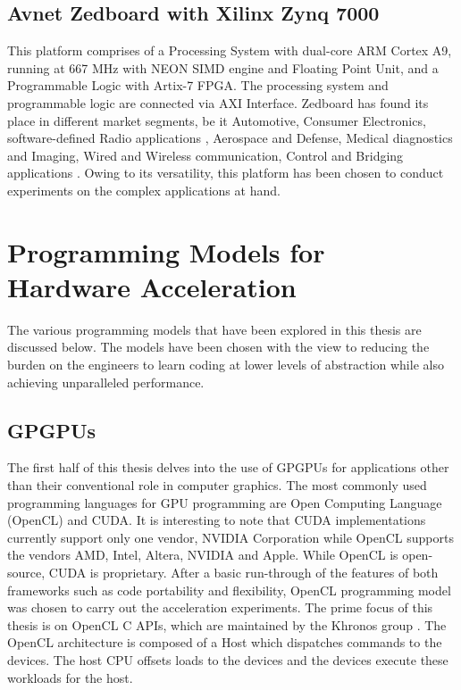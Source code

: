 \subsection{Avnet Zedboard with Xilinx Zynq 7000}
This platform comprises of a Processing System with dual-core ARM Cortex A9, running at 667 MHz with NEON SIMD engine and Floating Point Unit, and a Programmable Logic with Artix-7 FPGA. The processing system and programmable logic are connected via AXI Interface. Zedboard has found its place in different market segments, be it Automotive, Consumer Electronics, software-defined Radio applications \cite{dobson2014architecture}, Aerospace and Defense, Medical diagnostics and Imaging, Wired and Wireless communication, Control and Bridging applications \cite{xil_zynqbrief}. Owing to its versatility, this platform has been chosen to conduct experiments on the complex applications at hand.
\section{Programming Models for Hardware Acceleration}
\label{2_3}
The various programming models that have been explored in this thesis are discussed below. The models have been chosen with the view to reducing the burden on the engineers to learn coding at lower levels of abstraction while also achieving unparalleled performance.
\subsection{GPGPUs}
\label{2_3_1}
The first half of this thesis delves into the use of GPGPUs for applications other than their conventional role in computer graphics. The most commonly used programming languages for GPU programming are Open Computing Language (OpenCL) and CUDA. It is interesting to note that CUDA implementations currently support only one vendor, NVIDIA Corporation while OpenCL supports the vendors AMD, Intel, Altera, NVIDIA and Apple.\newline \newline
While OpenCL is open-source, CUDA is proprietary. After a basic run-through of the features of both frameworks such as code portability and flexibility, OpenCL programming model was chosen to carry out the acceleration experiments. The prime focus of this thesis is on OpenCL C APIs, which are maintained by the Khronos group \cite{khronos2008opencl}. The OpenCL architecture is composed of a Host which dispatches commands to the devices. The host CPU offsets loads to the devices and the devices execute these workloads for the host.

